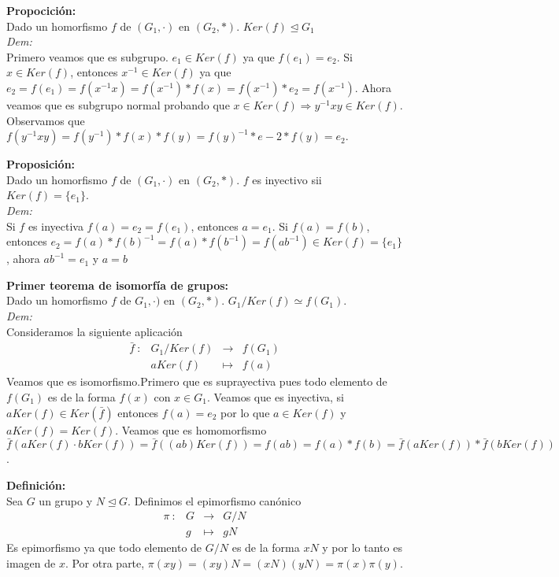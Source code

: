 \documentclass{article}
\begin{document}
\textbf{Propocición:}\\
Dado un homorfismo $f$ de $(G_1,\cdot)$ en $(G_2,*)$. $Ker(f)\trianglelefteq G_1$\\
\textit{Dem:}\\
Primero veamos que es subgrupo. $e_1\in Ker(f)$ ya que $f(e_1)=e_2$. Si $x\in Ker(f)$, entonces $x^{-1}\in Ker(f)$ ya que $e_2=f(e_1)=f(x^{-1} x)=f(x^{-1})*f(x)=f(x^{-1})*e_2=f(x^{-1})$. Ahora veamos que es subgrupo normal probando que $x\in Ker(f) \Rightarrow y^{-1}xy\in Ker(f)$. Observamos que $f(y^{-1}xy)=f(y^{-1})*f(x)*f(y)=f(y)^{-1}*e-2*f(y)=e_2$.

\textbf{Proposición:}\\
Dado un homorfismo $f$ de $(G_1,\cdot)$ en $(G_2,*)$. $f$ es inyectivo sii $Ker(f)=\{e_1\}$.\\
\textit{Dem:}\\
Si $f$ es inyectiva $f(a)=e_2=f(e_1)$, entonces $a=e_1$. Si $f(a)=f(b)$, entonces $e_2=f(a)*f(b)^{-1}=f(a)*f(b^{-1})=f(ab^{-1})\in Ker(f)=\{e_1\}$, ahora $ab^{-1}=e_1$ y $a=b$

\textbf{Primer teorema de isomorfía de grupos:}\\
Dado un homorfismo $f$ de $G_1,\cdot)$ en $(G_2,*)$. $G_1/Ker(f)\simeq f(G_1)$.\\
\textit{Dem:}\\
Consideramos la siguiente aplicación
$$
\begin{array}{cccc}
    \bar{f}\::&G_1/Ker(f)&\longrightarrow&f(G_1)\\
        &aKer(f)&\longmapsto&f(a)
\end{array}
$$
Veamos que es isomorfismo.Primero que es suprayectiva pues todo elemento de $f(G_1)$ es de la forma $f(x)$ con $x\in G_1$. Veamos que es inyectiva, si $aKer(f)\in Ker(\bar{f})$ entonces $f(a)=e_2$ por lo que $a\in Ker(f)$ y $aKer(f)=Ker(f)$. Veamos que es homomorfismo $\bar{f}(aKer(f)\cdot bKer(f))=\bar{f}((ab)Ker(f))=f(ab)=f(a)*f(b)=\bar{f}(aKer(f))*\bar{f}(bKer(f))$.

\textbf{Definición:}\\
Sea $G$ un grupo y $N\trianglelefteq G$. Definimos el epimorfismo canónico
$$
\begin{array}{cccc}
    \pi\::&G&\longrightarrow&G/N\\
        &g&\longmapsto&gN
\end{array}
$$
Es epimorfismo ya que todo elemento de $G/N$ es de la forma $xN$ y por lo tanto es imagen de $x$. Por otra parte, $\pi(xy)=(xy)N=(xN)(yN)=\pi(x)\pi(y)$.
\end{document}
